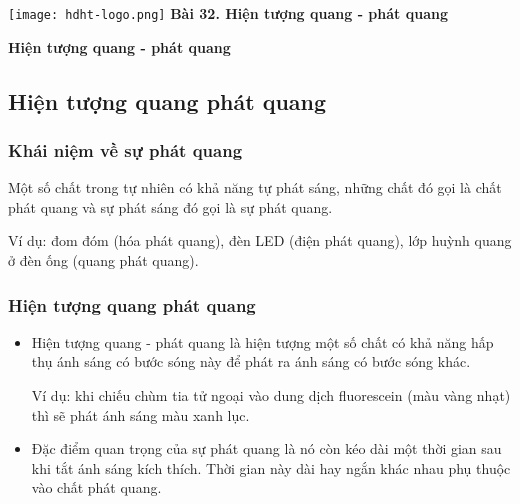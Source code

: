 \newcommand{\chapter}[2][]{
	\newcommand{\chapname}{#2}
	\begin{flushleft}
		\begin{minipage}[t]{\linewidth}
			\texttt{[image: hdht-logo.png]}
			\hspace{0pt}	
			\sffamily\bfseries\large Bài  32. Hiện tượng quang - phát quang
			\begin{flushleft}
				\huge\bfseries #1
			\end{flushleft}
		\end{minipage}
	\end{flushleft}
	\vspace{1cm}
	\normalfont\normalsize
}
\chapter[Hiện tượng quang - phát quang]{Hiện tượng quang - phát quang}

\subsection{Hiện tượng quang phát quang}
\subsubsection{Khái niệm về sự phát quang}
	Một số chất trong tự nhiên có khả năng tự phát sáng, những chất đó gọi là chất phát quang và sự phát sáng đó gọi là sự phát quang.
	
	Ví dụ: đom đóm (hóa phát quang), đèn LED (điện phát quang), lớp huỳnh quang ở đèn ống (quang phát quang).
\subsubsection{Hiện tượng quang phát quang}
\begin{itemize}
	\item Hiện tượng quang - phát quang là hiện tượng một số chất có khả năng hấp thụ ánh sáng có bước sóng này để phát ra ánh sáng có bước sóng khác.
	
	Ví dụ: khi chiếu chùm tia tử ngoại vào dung dịch fluorescein (màu vàng nhạt) thì sẽ phát ánh sáng màu xanh lục.
	\item Đặc điểm quan trọng của sự phát quang là nó còn kéo dài một thời gian sau khi tắt ánh sáng kích thích. Thời gian này dài hay ngắn khác nhau phụ thuộc vào chất phát quang.
\end{itemize}
